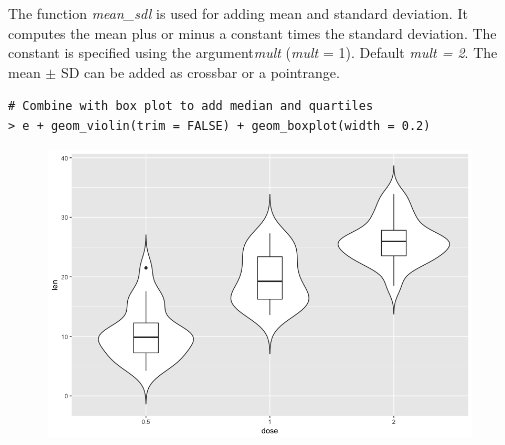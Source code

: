 The function \textit{mean\_sdl} is used for adding mean and standard deviation. It computes the mean plus or minus a constant times the standard deviation. The constant is specified using the argument\textit{mult} (\textit{mult} = 1). Default \textit{mult = 2}.\newline
The mean $\pm$ SD can be added as crossbar or a pointrange. 
\begin{lstlisting}[language=html]
# Combine with box plot to add median and quartiles
> e + geom_violin(trim = FALSE) + geom_boxplot(width = 0.2)
\end{lstlisting}
\begin{figure}[H]\begin{center}\includegraphics[scale=1 ]{ilu/bg94.png}\end{center}\end{figure}

